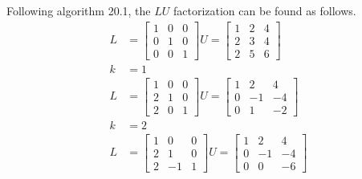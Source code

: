 \documentclass[11pt]{article}
\begin{document}
\begin{enumerate}
\begin{enumerate}
                Following algorithm 20.1, the $LU$ factorization can be found
                as follows.
                \begin{align*}
                    L &=
                    \begin{bmatrix}
                        1 & 0 & 0 \\
                        0 & 1 & 0 \\
                        0 & 0 & 1
                    \end{bmatrix}
                    U =
                    \begin{bmatrix}
                        1 & 2 & 4 \\
                        2 & 3 & 4 \\
                        2 & 5 & 6
                    \end{bmatrix} \\
                    k &= 1 \\
                    L &=
                    \begin{bmatrix}
                        1 & 0 & 0 \\
                        2 & 1 & 0 \\
                        2 & 0 & 1
                    \end{bmatrix}
                    U =
                    \begin{bmatrix}
                        1 & 2 & 4 \\
                        0 & -1 & -4 \\
                        0 & 1 & -2
                    \end{bmatrix} \\
                    k &= 2 \\
                    L &=
                    \begin{bmatrix}
                        1 & 0 & 0 \\
                        2 & 1 & 0 \\
                        2 & -1 & 1
                    \end{bmatrix}
                    U =
                    \begin{bmatrix}
                        1 & 2 & 4 \\
                        0 & -1 & -4 \\
                        0 & 0 & -6
                    \end{bmatrix} \\

\end{align*}
\end{enumerate}
\end{enumerate}
\end{document}
